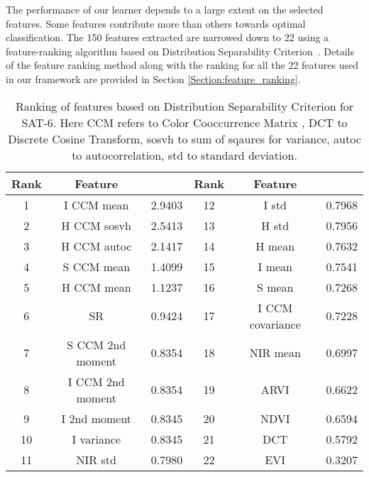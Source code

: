 \documentclass[]{interact}
\theoremstyle{plain}\newtheorem{theorem}{Theorem}[section]
\theoremstyle{definition}
\theoremstyle{remark}
\begin{document}
The performance of our learner depends to a large extent on the selected features. Some features contribute more than others towards optimal classification. The 150 features extracted are narrowed down to 22 using a feature-ranking algorithm based on Distribution Separability Criterion~\citep{Boureau10atheoretical}. Details of the feature ranking method along with the ranking for all the 22 features used in our framework are provided in Section \ref{Section:feature_ranking}. 


\begin{table}[b]
\begin{center}
\footnotesize
\begin{tabular}{cccccc}
\hline
 \textbf{Rank} & \textbf{Feature} & \multicolumn{1}{c|}{} & \textbf{Rank} & \textbf{Feature}        &        \\ \hline
1&I CCM mean         & \multicolumn{1}{c|}{2.9403}              & 12   &   I std    &   0.7968    \\
2 & H CCM sosvh       & \multicolumn{1}{c|}{2.5413}             & 13   &   H std    &    0.7956  \\
3 & H CCM autoc     & \multicolumn{1}{c|}{2.1417}               & 14   &   H mean   &   0.7632  \\
4 & S CCM mean       & \multicolumn{1}{c|}{1.4099}              & 15   &   I mean   &    0.7541  \\
5 &  H CCM mean         & \multicolumn{1}{c|}{1.1237}           & 16   &   S mean   &     0.7268 \\
6 &   SR          & \multicolumn{1}{c|}{0.9424}                 & 17   &   I CCM covariance & 0.7228 \\
7 &   S CCM 2nd moment         & \multicolumn{1}{c|}{0.8354}    & 18   &   NIR mean &    0.6997\\
8 &   I CCM 2nd moment         & \multicolumn{1}{c|}{0.8354}    & 19   &   ARVI     &     0.6622 \\
9  &   I 2nd moment    & \multicolumn{1}{c|}{0.8345}            & 20   &   NDVI     &     0.6594\\
10   &  I variance         & \multicolumn{1}{c|}{0.8345}        & 21   &    DCT     &    0.5792 \\
11   &   NIR std         & \multicolumn{1}{c|}{0.7980}          & 22   &    EVI     &    0.3207 \\ 
\hline 
\end{tabular}
\end{center}
\caption{Ranking of features based on Distribution Separability Criterion for SAT-6. Here CCM refers to Color Cooccurrence Matrix \citep{boyda2017deploying}, DCT to Discrete Cosine Transform, sosvh to sum of sqaures for variance, autoc to autocorrelation, std to standard deviation.}
\label{table:Feature_ranking}
\end{table}
\end{document}
